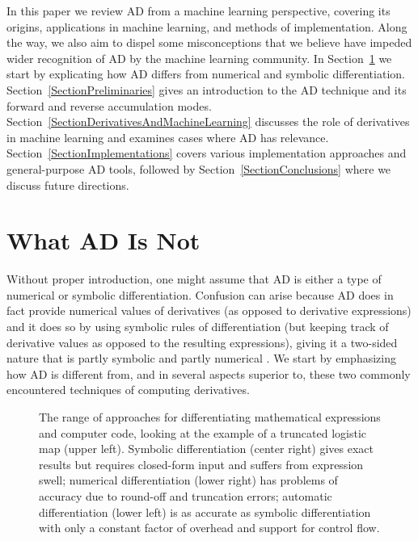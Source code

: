 \documentclass[twoside,11pt]{article}
\begin{document}
In this paper we review AD from a machine learning perspective, covering its origins, applications in machine learning, and methods of implementation. Along the way, we also aim to dispel some misconceptions that we believe have impeded wider recognition of AD by the machine learning community. In Section~\ref{SectionWhatADIsNot} we start by explicating how AD differs from numerical and symbolic differentiation. Section~\ref{SectionPreliminaries} gives an introduction to the AD technique and its forward and reverse accumulation modes. Section~\ref{SectionDerivativesAndMachineLearning} discusses the role of derivatives in machine learning and examines cases where AD has relevance. Section~\ref{SectionImplementations} covers various implementation approaches and general-purpose AD tools, followed by Section~\ref{SectionConclusions} where we discuss future directions.

\section{What AD Is Not}
\label{SectionWhatADIsNot}

Without proper introduction, one might assume that AD is either a type of numerical or symbolic differentiation. Confusion can arise because AD does in fact provide numerical values of derivatives (as opposed to derivative expressions) and it does so by using symbolic rules of differentiation (but keeping track of derivative values as opposed to the resulting expressions), giving it a two-sided nature that is partly symbolic and partly numerical \citep{Griewank2003}. We start by emphasizing how AD is different from, and in several aspects superior to, these two commonly encountered techniques of computing derivatives.

\begin{figure}
  \centering
  \trimbox{0cm -0.4cm}{\resizebox{\textwidth}{!}{\small}}
  \caption{The range of approaches for differentiating mathematical expressions and computer code, looking at the example of a truncated logistic map (upper left). Symbolic differentiation (center right) gives exact results but requires closed-form input and suffers from expression swell; numerical differentiation (lower right) has problems of accuracy due to round-off and truncation errors; automatic differentiation (lower left) is as accurate as symbolic differentiation with only a constant factor of overhead and support for control flow.}
  \label{FigureDifferentiation}
\end{figure}
\end{document}
